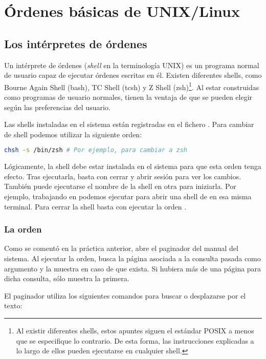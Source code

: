 \chapter{Órdenes básicas de UNIX/Linux}

\section{Los intérpretes de órdenes}

Un intérprete de órdenes (\textit{shell} en la terminología UNIX) es un programa normal de usuario capaz de ejecutar órdenes escritas en él.
Existen diferentes shells, como Bourne Again Shell (bash), TC Shell (tcsh) y Z Shell (zsh)\footnote{Al existir diferentes shells, estos apuntes siguen el estándar POSIX a menos que se especifique lo contrario. De esta forma, las instrucciones explicadas a lo largo de ellos pueden ejecutarse en cualquier shell.}.
Al estar construidas como programas de usuario normales, tienen la ventaja de que se pueden elegir según las preferencias del usuario.

Las shells instaladas en el sistema están registradas en el fichero .
Para cambiar de shell podemos utilizar la siguiente orden:

\begin{lstlisting}[language=sh]
chsh -s /bin/zsh # Por ejemplo, para cambiar a zsh
\end{lstlisting}

Lógicamente, la shell debe estar instalada en el sistema para que esta orden tenga efecto.
Tras ejecutarla, basta con cerrar y abrir sesión para ver los cambios.
También puede ejecutarse el nombre de la shell en otra para iniziarla.
Por ejemplo, trabajando en  podemos ejecutar  para abrir una shell de  en esa misma terminal.
Para cerrar la shell basta con ejecutar la orden .

\subsection{La orden }

Como se comentó en la práctica anterior,  abre el paginador del manual del sistema.
Al ejecutar la orden,  busca la página asociada a la consulta pasada como argumento y la muestra en caso de que exista.
Si hubiera más de una página para dicha consulta,  sólo muestra la primera.

El paginador utiliza los siguientes comandos para buscar o desplazarse por el texto:

